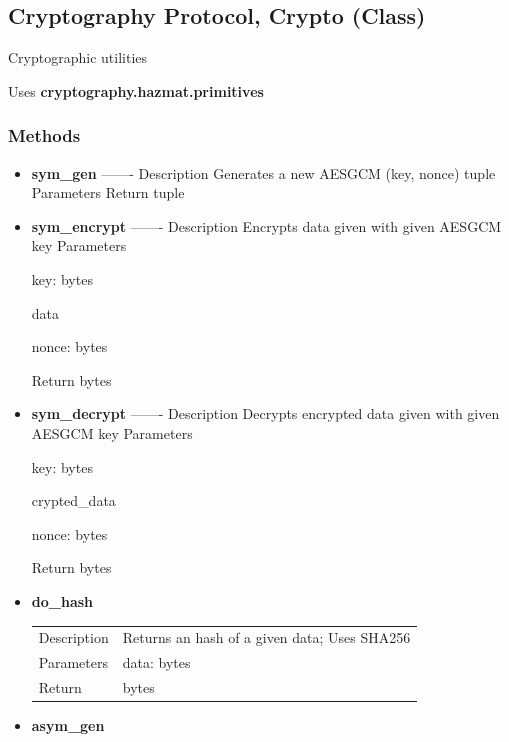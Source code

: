 \documentclass[11pt]{article}
\begin{document}
\subsection{Cryptography Protocol, Crypto
(Class)}\label{cryptography-protocol-crypto-class}

Cryptographic utilities

Uses \textbf{cryptography.hazmat.primitives}

\subsubsection{Methods}\label{methods}

\begin{itemize}
\item
  \textbf{sym\_gen} \textbar{} \textbar{} \textbar{}
  \textbar---\textbar----\textbar{} \textbar{} Description \textbar{}
  Generates a new AESGCM (key, nonce) tuple\textbar{}
  \textbar Parameters\textbar\textbar{} \textbar Return \textbar{} tuple
  \textbar{}
\item
  \textbf{sym\_encrypt} \textbar{} \textbar{} \textbar{}
  \textbar---\textbar----\textbar{} \textbar{} Description \textbar{}
  Encrypts data given with given AESGCM key\textbar{}
  \textbar Parameters\textbar{}

  key: bytes

  data

  nonce: bytes

  \textbar Return \textbar{} bytes \textbar{}
\item
  \textbf{sym\_decrypt} \textbar{} \textbar{} \textbar{}
  \textbar---\textbar----\textbar{} \textbar{} Description \textbar{}
  Decrypts encrypted data given with given AESGCM key \textbar{}
  \textbar Parameters\textbar{}

  key: bytes

  crypted\_data

  nonce: bytes

  \textbar Return \textbar{} bytes \textbar{}
\item
  \textbf{do\_hash}

  \begin{longtable}[]{@{}ll@{}}
  \toprule
  \endhead
  Description & Returns an hash of a given data; Uses
  SHA256\tabularnewline
  Parameters & data: bytes\tabularnewline
  Return & bytes\tabularnewline
  \bottomrule
  \end{longtable}
\item
  \textbf{asym\_gen}


\end{itemize}
\end{document}
